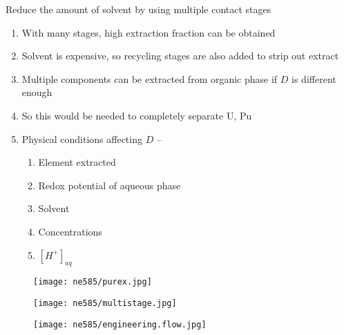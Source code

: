 \documentclass[aspectratio=1610,pdftex,dvipsnames,compress,xcolor={dvipsnames}]{beamer}
\begin{document}
\begin{frame}{Reduce the amount of solvent by using multiple contact stages}
    \begin{enumerate}[topsep=0pt,itemsep=21pt,leftmargin=*,label=(\arabic*)]
        \item[]With many stages, high extraction fraction can be obtained
        \item[]Solvent is expensive, so recycling stages are also added to strip out extract
        \item[]Multiple components can be extracted from organic phase if $D$ is different enough
        \item[]So this would be needed to completely separate U, Pu
        \item[]Physical conditions affecting $D$ --
            \begin{enumerate}[topsep=0pt,itemsep=3pt,leftmargin=*,label=(\arabic*)]
                \item[]Element extracted
                \item[]Redox potential of aqueous phase
                \item[]Solvent
                \item[]Concentrations
                \item[]$[H^+]_{aq}$
            \end{enumerate}
    \end{enumerate}
\end{frame}


\begin{frame}{}
    \begin{figure}
        \centering
        \texttt{[image: ne585/purex.jpg]}
    \end{figure}
\end{frame}


\begin{frame}{}
    \begin{figure}
        \centering
        \texttt{[image: ne585/multistage.jpg]}
    \end{figure}
\end{frame}


\begin{frame}{}
    \begin{figure}
        \centering
        \texttt{[image: ne585/engineering.flow.jpg]}
    \end{figure}
\end{frame}
\end{document}
